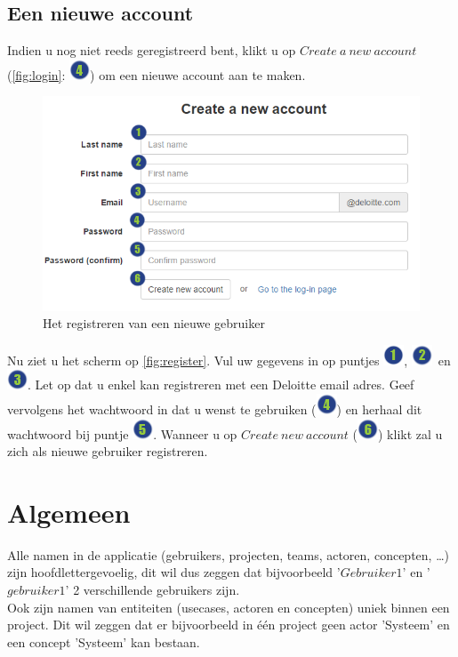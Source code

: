 \documentclass[a4paper,11pt]{article}
\newcommand{\one}{\includegraphics[scale=0.5]{Gebruikershandleiding_img/1.png}}
\newcommand{\two}{\includegraphics[scale=0.5]{Gebruikershandleiding_img/2.png}}
\newcommand{\three}{\includegraphics[scale=0.5]{Gebruikershandleiding_img/3.png}}
\newcommand{\four}{\includegraphics[scale=0.5]{Gebruikershandleiding_img/4.png}}
\newcommand{\five}{\includegraphics[scale=0.5]{Gebruikershandleiding_img/5.png}}
\newcommand{\six}{\includegraphics[scale=0.5]{Gebruikershandleiding_img/6.png}}
\begin{document}
\subsection{Een nieuwe account}
Indien u nog niet reeds geregistreerd bent, klikt u op $Create\ a\ new\ account$ (\autoref{fig:login}: \four) om een nieuwe account aan te maken.

\begin{figure}[H]
\centering
\includegraphics[scale=0.5]{Gebruikershandleiding_img/register.png}
\caption{Het registreren van een nieuwe gebruiker}
\label{fig:register}
\end{figure}

Nu ziet u het scherm op \autoref{fig:register}. Vul uw gegevens in op puntjes \one, \two\ en \three. Let op dat u enkel kan registreren met een Deloitte email adres. Geef vervolgens het wachtwoord in dat u wenst te gebruiken (\four) en herhaal dit wachtwoord bij puntje \five. Wanneer u op $Create\ new\ account$ (\six) klikt zal u zich als nieuwe gebruiker registreren.

\section{Algemeen}
Alle namen in de applicatie (gebruikers, projecten, teams, actoren, concepten, \ldots) zijn hoofdlettergevoelig, dit wil dus zeggen dat bijvoorbeeld '$Gebruiker1$' en '$gebruiker1$' 2 verschillende gebruikers zijn.\\
Ook zijn namen van entiteiten (usecases, actoren en concepten) uniek binnen een project. Dit wil zeggen dat er bijvoorbeeld in \'e\'en project geen actor 'Systeem' en een concept 'Systeem' kan bestaan.
\end{document}
